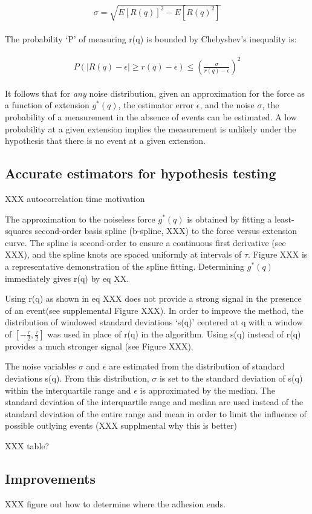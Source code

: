 \documentclass[%
  aip,12pt,tightenlines,
  amsthm,
 amsmath,amssymb
]{article}
\newcommand{\eqs}[1]{
\begin{align*} 
\begin{split}
#1
\end{split}					
\end{align*}}
\newcommand{\pl}[0]{\vspace{6pt}}
\begin{document}
\eqs{ \sigma = \sqrt{E[R(q)]^2 - E[R(q)^2] } }

The probability `P' of measuring r(q) is bounded by Chebyshev's inequality is:

\eqs{ P( |R(q)-\epsilon| \ge r(q)-\epsilon ) \le
 (\frac{\sigma}{r(q)-\epsilon})^2 }

It follows that for \emph{any} noise distribution, given an approximation for the force as a function of extension $g^{*}(q)$, the estimator error $\epsilon$, and the noise $\sigma$, the probability of a measurement in the absence of events can be estimated. A low probability at a given extension implies the measurement is unlikely under the hypothesis that there is no event at a given extension. 

\subsection{Accurate estimators for hypothesis testing}

XXX autocorrelation time motivation \pl 

The approximation to the noiseless force $g^{*}(q)$ is obtained by fitting a least-squares second-order basis spline (b-spline, XXX) to the force versus extension curve. The spline is second-order to ensure a continuous first derivative (see XXX), and the spline knots are spaced uniformly at intervals of $\tau$. Figure XXX is a representative demonstration of the spline fitting. Determining  $g^{*}(q)$ immediately gives r(q) by eq XX.  \pl

Using r(q) as shown in eq XXX does not provide a strong signal in the presence of an event(see supplemental Figure XXX). In order to improve the method, the distribution of windowed standard deviations `s(q)' centered at q with a window of $[-\frac{\tau}{2},\frac{\tau}{2}]$ was used in place of r(q) in the algorithm. Using s(q) instead of r(q) provides a much stronger signal (see Figure XXX).  \pl

The noise variables $\sigma$ and $\epsilon$ are estimated from the distribution of standard deviations s(q). From this distribution, $\sigma$ is set to the standard deviation of s(q) within the interquartile range and $\epsilon$ is approximated by the median. The standard deviation of the interquartile range and median are used instead of the standard deviation of the entire range and mean in order to limit the influence of possible outlying events (XXX supplmental why this is better) \pl

XXX table?

\subsection{Improvements}

XXX figure out how to determine where the adhesion ends.
\end{document}

